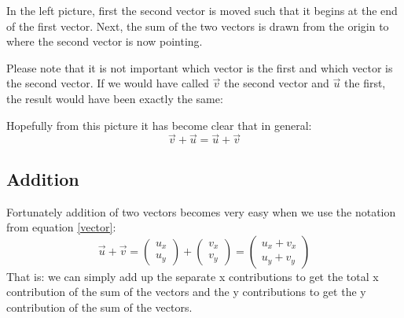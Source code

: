 \documentclass[a4paper]{report}
\begin{document}
In the left picture, first the second vector is moved such that it begins at the end of the first vector. Next, the sum of the two vectors is drawn from the origin to where the second vector is now pointing.
\begin{mdframed}
Please note that it is not important which vector is the first and which vector is the second vector. If we would have called $\vec{v}$ the second vector and $\vec{u}$ the first, the result would have been exactly the same:
\begin{center}
\end{center}
Hopefully from this picture it has become clear that in general:
\begin{equation*}
\vec{v} + \vec{u} = \vec{u} + \vec{v}
\end{equation*}
\end{mdframed}
\subsection{Addition}
Fortunately addition of two vectors becomes very easy when we use the notation from equation \ref{vector}:
\begin{equation}
\vec{u} + \vec{v} = 
\begin{pmatrix}
u_x\\
u_y
\end{pmatrix}
+
\begin{pmatrix}
v_x\\
v_y
\end{pmatrix}
=
\begin{pmatrix}
u_x + v_x \\
u_y + v_y
\end{pmatrix}
\end{equation}
That is: we can simply add up the separate x contributions to get the total x contribution of the sum of the vectors and the y contributions to get the y contribution of the sum of the vectors.
\end{document}
